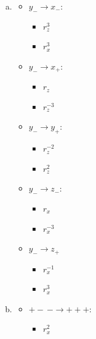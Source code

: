 \begin{enumerate}[(a)]
\item
\begin{multicols}{3}
	\begin{itemize}
	\item
	$y_-\rightarrow x_-$: 
		\begin{itemize}
		\item
		$r_z^{3}$
		
		\item
		$r_x^{3}$
		\end{itemize}
				
	\item
	$y_-\rightarrow x_+$:
		\begin{itemize}
		\item
		$r_z$
		
		\item
		$r_z^{-3}$
		\end{itemize}
				
	\item
	$y_-\rightarrow y_+$:   
		\begin{itemize}
		\item
		$r_z^{-2}$ 
		
		\item
		$r_z^{2}$
		\end{itemize}
	
	\columnbreak
	
	\item
	$y_-\rightarrow z_-$:    
		\begin{itemize}
		\item
		$r_x$
		
		\item
		$r_x^{-3}$
		\end{itemize}
		
	\item
	 $y_-\rightarrow z_+$
		\begin{itemize}
		\item
		$r_x^{-1}$
		
		\item
		$r_x^{3}$
		\end{itemize}
	\end{itemize}
	\end{multicols}
	
\item
\begin{multicols}{3}
	\begin{itemize}
	\item
	$+-\,-\rightarrow +++$: 
		\begin{itemize}
		\item
		$r_x^2$
		

\end{itemize}
\end{itemize}
\end{multicols}
\end{enumerate}
